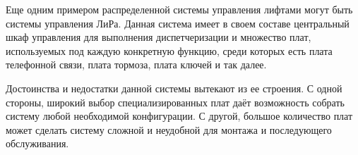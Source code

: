 	Еще одним примером распределенной системы управления лифтами
		могут быть системы управления ЛиРа. Данная система имеет в своем составе
		центральный шкаф управления для выполнения диспетчеризации и множество плат,
		используемых под каждую конкретную функцию, среди которых
		есть плата телефонной связи, плата тормоза, плата ключей и так далее.

	Достоинства и недостатки данной системы вытекают из ее строения.
		С одной стороны, широкий выбор специализированных плат даёт
		возможность собрать систему любой необходимой конфигурации.
		С другой, большое количество плат может сделать систему сложной
		и неудобной для монтажа и последующего обслуживания.
